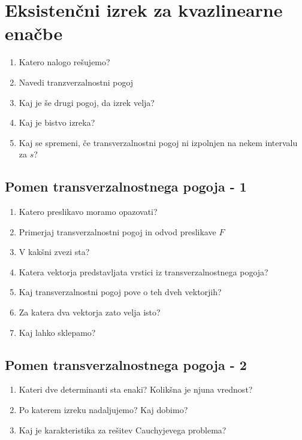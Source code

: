 \documentclass{article}
\begin{document}
    \section{Eksistenčni izrek za kvazlinearne enačbe}
    \begin{enumerate}
        \item Katero nalogo rešujemo?
        \item Navedi tranzverzalnostni pogoj
        \item Kaj je še drugi pogoj, da izrek velja?
        \item Kaj je bistvo izreka?
        \item Kaj se spremeni, če transverzalnostni pogoj ni izpolnjen na nekem intervalu za $s$?
    \end{enumerate}

    \subsection{Pomen transverzalnostnega pogoja - 1}
    \begin{enumerate}
        \item Katero preslikavo moramo opazovati?
        \item Primerjaj transverzalnostni pogoj in odvod preslikave $F$
        \item V kakšni zvezi sta?
        \item Katera vektorja predstavljata vrstici iz transverzalnostnega pogoja?
        \item Kaj transverzalnostni pogoj pove o teh dveh vektorjih?
        \item Za katera dva vektorja zato velja isto?
        \item Kaj lahko sklepamo?
    \end{enumerate}

    \subsection{Pomen transverzalnostnega pogoja - 2}
    \begin{enumerate}
        \item Kateri dve determinanti sta enaki? Kolikšna je njuna vrednost?
        \item Po katerem izreku nadaljujemo? Kaj dobimo?
        \item Kaj je karakteristika za rešitev Cauchyjevega problema?
    \end{enumerate}
\end{document}
